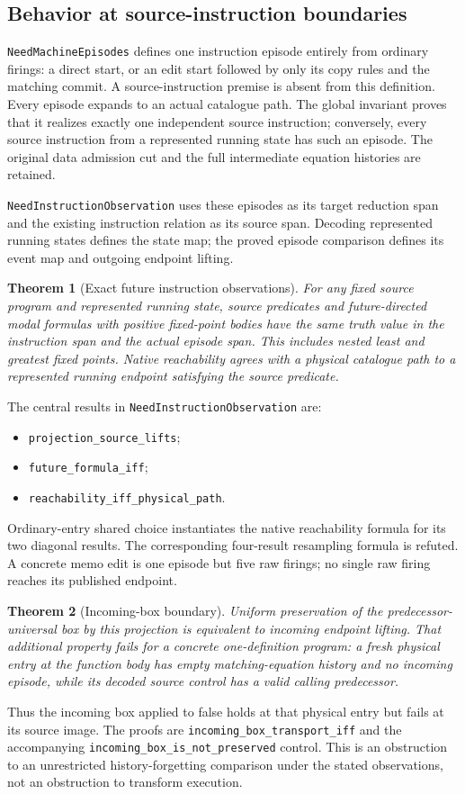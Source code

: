 \documentclass[11pt]{article}
\newtheorem{theorem}{Theorem}
\newcommand{\code}[1]{\texttt{\small #1}}
\begin{document}
\subsection{Behavior at source-instruction boundaries}

\code{NeedMachineEpisodes} defines one instruction episode entirely from
ordinary firings: a direct start, or an edit start followed by only its
copy rules and the matching commit. A source-instruction premise is absent
from this definition. Every episode expands to an actual catalogue path.
The global invariant proves that it realizes exactly one independent
source instruction; conversely, every source instruction from a represented
running state has such an episode. The original data admission cut and
the full intermediate equation histories are retained.

\code{NeedInstructionObservation} uses these episodes as its target
reduction span and the existing instruction relation as its source span.
Decoding represented running states defines the state map; the proved
episode comparison defines its event map and outgoing endpoint lifting.

\begin{theorem}[Exact future instruction observations]
For any fixed source program and represented running state, source
predicates and future-directed modal formulas with positive fixed-point
bodies have the same truth value in the instruction span and the actual
episode span. This includes nested least and greatest fixed points.
Native reachability agrees with a physical catalogue path to a represented
running endpoint satisfying the source predicate.
\end{theorem}
The central results in \code{NeedInstructionObservation} are:
\begin{itemize}
\item \code{projection\_source\_lifts};
\item \code{future\_formula\_iff};
\item \code{reachability\_iff\_physical\_path}.
\end{itemize}
Ordinary-entry shared choice
instantiates the native reachability formula for its two diagonal results.
The corresponding four-result resampling formula is refuted. A concrete
memo edit is one episode but five raw firings; no single raw firing reaches
its published endpoint.

\begin{theorem}[Incoming-box boundary]
Uniform preservation of the predecessor-universal box by this projection
is equivalent to incoming endpoint lifting. That additional property fails
for a concrete one-definition program: a fresh physical entry at the
function body has empty matching-equation history and no incoming episode,
while its decoded source control has a valid calling predecessor.
\end{theorem}
Thus the incoming box applied to false holds at that physical entry but
fails at its source image. The proofs are
\code{incoming\_box\_transport\_iff} and the accompanying
\code{incoming\_box\_is\_not\_preserved} control. This is an obstruction
to an unrestricted history-forgetting comparison under the stated
observations, not an obstruction to transform execution.
\end{document}

